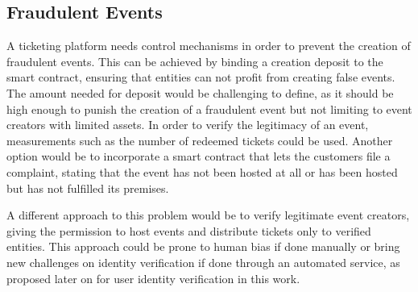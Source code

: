 \subsection{Fraudulent Events}\label{subsection:fraudulent-events}
A ticketing platform needs control mechanisms in order to prevent the creation of fraudulent events. This can be achieved by binding a creation deposit to the smart contract, ensuring that entities can not profit from creating false events. The amount needed for deposit would be challenging to define, as it should be high enough to punish the creation of a fraudulent event but not limiting to event creators with limited assets. In order to verify the legitimacy of an event, measurements such as the number of redeemed tickets could be used. Another option would be to incorporate a smart contract that lets the customers file a complaint, stating that the event has not been hosted at all or has been hosted but has not fulfilled its premises. 

A different approach to this problem would be to verify legitimate event creators, giving the permission to host events and distribute tickets only to verified entities. This approach could be prone to human bias if done manually or bring new challenges on identity verification if done through an automated service, as proposed later on for user identity verification in this work.
